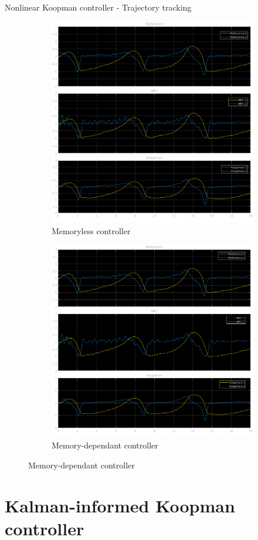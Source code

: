 \documentclass{beamer}
\begin{document}
\begin{frame}{Nonlinear Koopman controller - Trajectory tracking}
    \begin{figure}
        \centering
        \begin{subfigure}[b]{0.45\textwidth}
            \centering
            \includegraphics[width=\textwidth]{Undelayed_Koopman_Ref.png}
            \caption{Memoryless controller}
        \end{subfigure}
        \hfill
        \begin{subfigure}[b]{0.45\textwidth}
            \centering
            \includegraphics[width=\textwidth]{Delayed_Koopman_Ref.png}
            \caption{Memory-dependant controller}
        \end{subfigure}
    \end{figure}
\end{frame}


\section{Kalman-informed Koopman controller}
\end{document}
